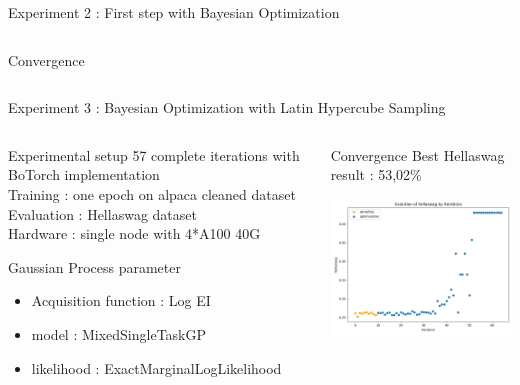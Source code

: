 \begin{frame}[allowframebreaks]{Experiment 2 : First step with Bayesian Optimization}
\begin{columns}
\begin{column}[t]{0.4\textwidth}
\begin{block}{Convergence}
            \end{block}  
            
        \end{column}
    \end{columns}    
\end{frame}

\begin{frame}[allowframebreaks]{Experiment 3 : Bayesian Optimization with Latin Hypercube Sampling}


    \begin{columns}
    
        \begin{column}[t]{0.6\textwidth}
    \begin{block}{Experimental setup}
        57 complete iterations with BoTorch implementation\\
        Training : one epoch on alpaca cleaned dataset\\
        Evaluation : Hellaswag dataset\\
        Hardware : single node with 4*A100 40G
    \end{block}

    \begin{block}{Gaussian Process parameter}
    \begin{itemize}
        \item Acquisition function : Log EI
        \item model : MixedSingleTaskGP
        \item likelihood : ExactMarginalLogLikelihood
    \end{itemize}
        
    \end{block}  
        \end{column}

        \begin{column}[t]{0.4\textwidth}
            \begin{block}{Convergence}
            Best Hellaswag result : 53,02\%
            
        \includegraphics[width = 5cm]{imgs/exp03/score_by_iteration.png}
            

\end{block}
\end{column}
\end{columns}
\end{frame}
